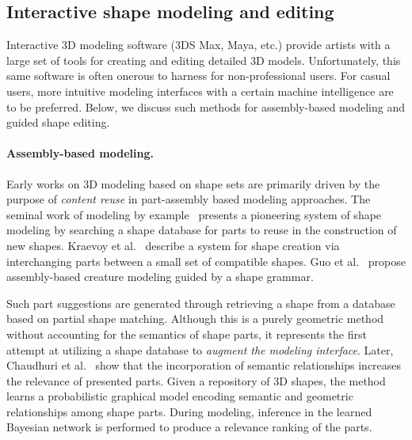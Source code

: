\subsection{Interactive shape modeling and editing}
\label{sec:interactive_modeling}
Interactive 3D modeling software (3DS Max, Maya, etc.) provide artists with a large set of tools
for creating and editing detailed 3D models.  Unfortunately, this same software is often onerous to harness for non-professional users.
For casual users, more intuitive modeling interfaces with a certain machine intelligence are to be preferred. Below, we discuss such methods for assembly-based modeling and guided shape editing.


\paragraph*{Assembly-based modeling.}
Early works on 3D modeling based on shape sets are primarily driven by the purpose of \emph{content reuse}
in part-assembly based modeling approaches.
The seminal work of modeling by example~\cite{Funkhouser:2004:MBE} presents a pioneering system
of shape modeling by searching a shape database for parts to reuse in the construction of new shapes.
Kraevoy et al.~ describe a system for shape creation
via interchanging parts between a small set of compatible shapes.
Guo et al.~\cite{Guo:2014:CG} propose assembly-based creature modeling guided by a shape grammar.

Such part suggestions are generated through retrieving a shape from a database based on partial shape matching.
Although this is a purely geometric method without accounting for the semantics of shape parts,
it represents the first attempt at utilizing a shape database to \emph{augment the modeling interface}.
Later, Chaudhuri et al.~ show that the incorporation of
semantic relationships increases the relevance of presented parts.
Given a repository of 3D shapes, the method learns a probabilistic graphical model encoding semantic and geometric
relationships among shape parts. During modeling, inference in the learned Bayesian network
is performed to produce a relevance ranking of the parts.

